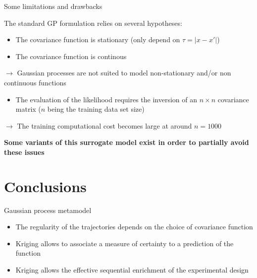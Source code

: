 \documentclass[9pt]{beamer}
\begin{document}
\begin{frame}{Some limitations and drawbacks}

The standard GP formulation relies on several hypotheses:

\begin{itemize}
\item The covariance function is stationary (only depend on $\tau = |x-x'|$)
\item The covariance function is continous
\end{itemize}
$\rightarrow$ Gaussian processes are not suited to model non-stationary and/or non continuous functions

\vspace{10pt}

\begin{itemize}
\item The evaluation of the likelihood requires the inversion of an $n \times n$ covariance matrix ($n$ being the training data set size) 
\end{itemize}
$\rightarrow$ The training computational cost becomes large at around $n = 1000$

\vspace{10pt}

\textbf{Some variants of this surrogate model exist in order to partially avoid these issues}
\end{frame}



\section{Conclusions}

\begin{frame}{Gaussian process metamodel }

\begin{itemize}
\item The regularity of the trajectories depends on the choice of covariance function
\vspace{0.6cm}
\item Kriging allows to associate a measure of certainty to a prediction of the function
\vspace{0.6cm}
\item Kriging allows the effective sequential enrichment of the experimental design
\end{itemize}

\end{frame}
\end{document}
